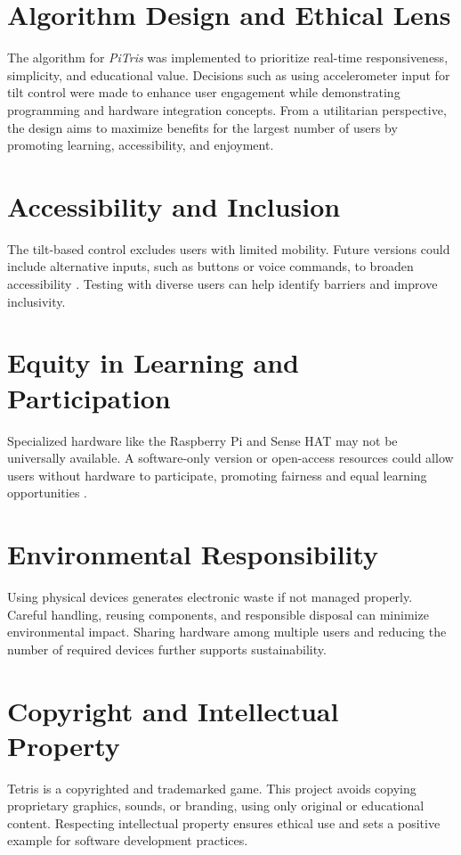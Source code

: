\documentclass[12pt]{report}
\begin{document}
\section{Algorithm Design and Ethical Lens}
The algorithm for \textit{PiTris} was implemented to prioritize real-time responsiveness, simplicity, and educational value. Decisions such as using accelerometer input for tilt control were made to enhance user engagement while demonstrating programming and hardware integration concepts. From a utilitarian perspective, the design aims to maximize benefits for the largest number of users by promoting learning, accessibility, and enjoyment.

\section{Accessibility and Inclusion}
The tilt-based control excludes users with limited mobility. Future versions could include alternative inputs, such as buttons or voice commands, to broaden accessibility \cite{Seale2014}. Testing with diverse users can help identify barriers and improve inclusivity.

\section{Equity in Learning and Participation}
Specialized hardware like the Raspberry Pi and Sense HAT may not be universally available. A software-only version or open-access resources could allow users without hardware to participate, promoting fairness and equal learning opportunities \cite{warschauer2004technology}.

\section{Environmental Responsibility}
Using physical devices generates electronic waste if not managed properly. Careful handling, reusing components, and responsible disposal can minimize environmental impact. Sharing hardware among multiple users and reducing the number of required devices further supports sustainability.

\section{Copyright and Intellectual Property}
Tetris is a copyrighted and trademarked game. This project avoids copying proprietary graphics, sounds, or branding, using only original or educational content. Respecting intellectual property ensures ethical use and sets a positive example for software development practices.
\end{document}
